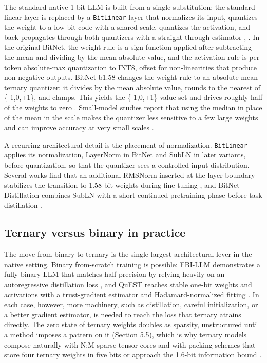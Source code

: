 \documentclass[11pt]{article}
\begin{document}
The standard native 1-bit LLM is built from a single substitution: the standard linear
layer is
replaced by a \texttt{BitLinear} layer that normalizes its input, quantizes the weight to a
low-bit code with a shared scale, quantizes the activation, and back-propagates through
both quantizers with a straight-through estimator \cite{Wang2023-BitNet},
\cite{Wang2025-BitNetJMLR}. In the original BitNet, the weight rule is a sign function
applied after subtracting the mean and dividing by the mean absolute value, and the
activation rule is per-token absolute-max quantization to INT8, offset for
non-linearities that produce non-negative outputs. BitNet b1.58 changes the weight rule
to an absolute-mean ternary quantizer: it divides by the mean absolute value, rounds to
the nearest of \{-1,0,+1\}, and clamps. This yields the \{-1,0,+1\} value set and drives
roughly half of the weights to zero \cite{Ma2024-BitNetB158}. Small-model studies report that
using the median in place of the mean in the scale makes the quantizer less sensitive
to a few large weights and can improve accuracy at very small scales
\cite{Nielsen2024-Reloaded}.

A recurring architectural detail is the placement of normalization. \texttt{BitLinear} applies
its normalization, LayerNorm in BitNet and SubLN in later variants, before quantization,
so that the quantizer sees a controlled input distribution. Several works find that an
additional RMSNorm inserted at the layer boundary stabilizes the transition to 1.58-bit
weights during fine-tuning \cite{Steinmetz2025-ExtraRMSNorm}, and BitNet Distillation
combines SubLN with a short continued-pretraining phase before task distillation
\cite{Wu2025-BitNetDistillation}.

\subsection{Ternary versus binary in practice}

The move from binary to ternary is the single largest architectural lever in the native
setting. Binary from-scratch training is possible: FBI-LLM demonstrates a fully binary
LLM that matches half precision by relying heavily on an autoregressive distillation
loss \cite{Ma2024-FBILLM}, and QuEST reaches stable one-bit weights and activations with a
trust-gradient estimator and Hadamard-normalized fitting \cite{Panferov2025-QuEST}. In each
case, however, more machinery, such as distillation, careful initialization, or a better
gradient estimator, is needed to reach the loss that ternary attains directly. The zero
state of ternary weights doubles as sparsity, unstructured until a method imposes a
pattern on it (Section 5.5), which is why ternary models
compose naturally with N:M sparse tensor cores \cite{Zhang2026-SparseBitNet} and with packing
schemes that store four ternary weights in five bits \cite{Huang2026-Sherry} or approach the
1.6-bit information bound \cite{Vaidhya2025-Spectra11}.
\end{document}
